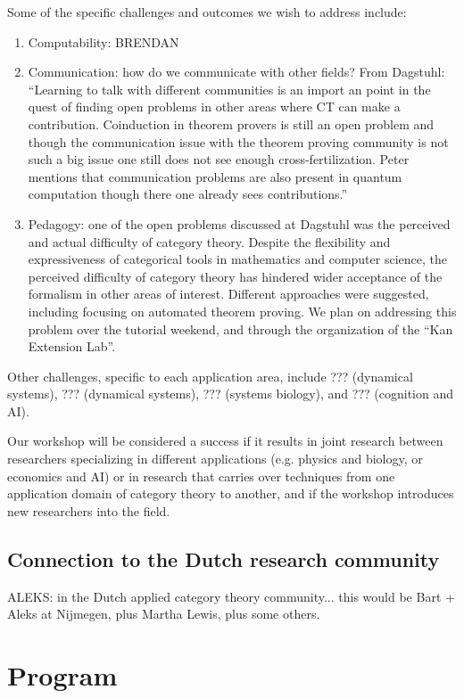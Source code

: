 \documentclass{article}
\newcommand{\redout}[1]{{\color{red}#1}}
\begin{document}
Some of the specific challenges and outcomes we wish to address include:
\begin{enumerate}
\item Computability: \redout{BRENDAN}
\item Communication: \redout{how do we communicate with other fields? From Dagstuhl: ``Learning to talk with different communities is an import an point in the quest of finding open problems in other areas where CT can make a contribution. Coinduction in theorem provers is still an open problem and though the communication issue with the theorem proving community is not such a big issue one still does not see enough cross-fertilization. Peter mentions that communication problems are also present in quantum computation though there one already sees contributions.''}
\item Pedagogy: one of the open problems discussed at Dagstuhl was the perceived and actual difficulty of category theory. Despite the flexibility and expressiveness of categorical tools in mathematics and computer science, the perceived difficulty of category theory has hindered wider acceptance of the formalism in other areas of interest. Different approaches were suggested, including focusing on automated theorem proving. We plan on addressing this problem over the tutorial weekend, and through the organization of the ``Kan Extension Lab''.
\end{enumerate}

Other challenges, specific to each application area, include \redout{???} (dynamical systems), \redout{???} (dynamical systems), \redout{???} (systems biology), and \redout{???} (cognition and AI).

Our workshop will be considered a success if it results in joint research between researchers specializing in different applications (e.g. physics and biology, or economics and AI) or in research that carries over techniques from one application domain of category theory to another, and if the workshop introduces new researchers into the field.

\subsection{Connection to the Dutch research community}
\redout{ALEKS: in the Dutch applied category theory community... this would be Bart + Aleks at Nijmegen, plus Martha Lewis, plus some others.}

\section{Program}
\end{document}

